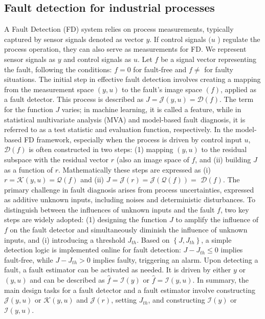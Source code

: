 \subsection{Fault detection for industrial processes}
A Fault Detection (FD) system relies on process measurements, typically captured by sensor signals denoted as vector $y$. If control signals $(u$ ) regulate the process operation, they can also serve as measurements for FD. We represent sensor signals as $y$ and control signals as $u$. Let $f$ be a signal vector representing the fault, following the conditions: $f=0$ for fault-free and $f \neq$ for faulty situations.
The initial step in effective fault detection involves creating a mapping from the measurement space $(y, u)$ to the fault's image space $(f)$, applied as a fault detector. This process is described as $J=\mathcal{J}(y, u)=\mathcal{D}(f)$.
The term for the function $J$ varies; in machine learning, it is called a feature, while in statistical multivariate analysis (MVA) and model-based fault diagnosis, it is referred to as a test statistic and evaluation function, respectively.
In the model-based FD framework, especially when the process is driven by control input $u$, $\mathcal{D}(f)$ is often constructed in two steps: (1) mapping $(y, u)$ to the residual subspace with the residual vector $r$ (also an image space of $f$, and (ii) building $J$ as a function of $r$. Mathematically these steps are expressed as (i) $r=\mathcal{K}(y, u)=\mathcal{Q}(f)$ and (ii) $J=\mathcal{J}(r)=\mathcal{J}(\mathcal{Q}(f))=$ $\mathcal{D}(f)$. The primary challenge in fault diagnosis arises from process uncertainties, expressed as additive unknown inputs, including noises and deterministic disturbances. To distinguish between the influences of unknown inputs and the fault $f$, two key steps are widely adopted: (1) designing the function $J$ to amplify the influence of $f$ on the fault detector and simultaneously diminish the influence of unknown inputs, and (i) introducing a threshold $J_{t h}$. Based on $\left\{J, J_{t h}\right\}$, a simple detection logic is implemented online for fault detection: $J-J_{t h} \leq 0$ implies fault-free, while $J-J_{t h}>0$ implies faulty, triggering an alarm. Upon detecting a fault, a fault estimator can be activated as needed. It is driven by either $y$ or $(y, u)$ and can be described as $\hat{f}=\mathcal{I}(y)$ or $\hat{f}=\mathcal{I}(y, u)$. In summary, the main design tasks for a fault detector and a fault estimator involve constructing $\mathcal{J}(y, u)$ or $\mathcal{K}(y, u)$ and $\mathcal{J}(r)$, setting $J_{t h}$, and constructing $\mathcal{I}(y)$ or $\mathcal{I}(y, u)$. 
